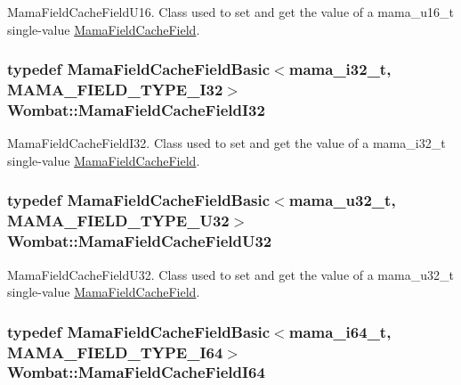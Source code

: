 MamaFieldCacheFieldU16. Class used to set and get the value of a mama\_\-u16\_\-t single-\/value {\ttfamily \hyperlink{classWombat_1_1MamaFieldCacheField}{MamaFieldCacheField}}. \hypertarget{namespaceWombat_a35a470f6b3aefa2ef20ef594378094f7}{
\subsubsection[{MamaFieldCacheFieldI32}]{\setlength{\rightskip}{0pt plus 5cm}typedef {\bf MamaFieldCacheFieldBasic}$<$mama\_\-i32\_\-t, MAMA\_\-FIELD\_\-TYPE\_\-I32$>$ {\bf Wombat::MamaFieldCacheFieldI32}}}
\label{namespaceWombat_a35a470f6b3aefa2ef20ef594378094f7}


MamaFieldCacheFieldI32. Class used to set and get the value of a mama\_\-i32\_\-t single-\/value {\ttfamily \hyperlink{classWombat_1_1MamaFieldCacheField}{MamaFieldCacheField}}. \hypertarget{namespaceWombat_a5af34a1565bbf22e343990ffaca469c2}{
\subsubsection[{MamaFieldCacheFieldU32}]{\setlength{\rightskip}{0pt plus 5cm}typedef {\bf MamaFieldCacheFieldBasic}$<$mama\_\-u32\_\-t, MAMA\_\-FIELD\_\-TYPE\_\-U32$>$ {\bf Wombat::MamaFieldCacheFieldU32}}}
\label{namespaceWombat_a5af34a1565bbf22e343990ffaca469c2}


MamaFieldCacheFieldU32. Class used to set and get the value of a mama\_\-u32\_\-t single-\/value {\ttfamily \hyperlink{classWombat_1_1MamaFieldCacheField}{MamaFieldCacheField}}. \hypertarget{namespaceWombat_a57de9ff30eb6422968703e327e83a2bb}{
\subsubsection[{MamaFieldCacheFieldI64}]{\setlength{\rightskip}{0pt plus 5cm}typedef {\bf MamaFieldCacheFieldBasic}$<$mama\_\-i64\_\-t, MAMA\_\-FIELD\_\-TYPE\_\-I64$>$ {\bf Wombat::MamaFieldCacheFieldI64}}}
\label{namespaceWombat_a57de9ff30eb6422968703e327e83a2bb}



